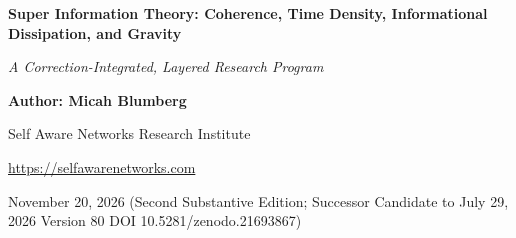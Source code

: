 \documentclass[
  american,
  11pt,
  letterpaper,
]{article}
\author{}
\date{}
\begin{document}
\begin{center}

{\LARGE\bfseries Super Information Theory: Coherence, Time Density, Informational Dissipation, and Gravity\par}

\vspace{0.35em}

{\large\itshape A Correction-Integrated, Layered Research Program\par}

\vspace{0.8em}

{\small\textbf{Author: Micah Blumberg}\par}

{\small Self Aware Networks Research Institute\par}

{\small\url{https://selfawarenetworks.com}\par}

{\small November 20, 2026 (Second Substantive Edition; Successor Candidate to July 29, 2026 Version 80 DOI 10.5281/zenodo.21693867)\par}

\end{center}

\vspace{0.65em}
\end{document}
